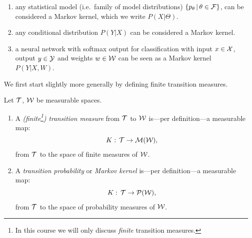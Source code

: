 \begin{Eg}
    \begin{enumerate}
        \item any statistical model (i.e.\ family of model distributions) $\{p_\theta \,|\, \theta \in \mathcal{F}\}$, can 
            be considered a Markov kernel, which we write $P(X|\Theta)$.
        \item any conditional distribution $P(Y|X)$ can be considered a Markov kernel.
        \item a neural network with softmax output for classification with 
            input $x \in \mathcal{X}$, output $y \in \mathcal{Y}$ and weights $w \in \mathcal{W}$ can be seen as a Markov kernel $P(Y|X,W)$.

    \end{enumerate}
\end{Eg}


We first start slightly more generally by defining finite transition measures.

\begin{Def}
    \label{def-finite-transition-measure}
    Let $\mathcal{T}$, $\mathcal{W}$ be measurable spaces.
    \begin{enumerate}
      \item A \emph{(finite\footnote{In this course we will only discuss \emph{finite} transition measures.}) transition measure}  from $\mathcal{T}$ to $\mathcal{W}$
    is---per definition---a measurable map:
    \[ K:\, \mathcal{T} \to \mathcal{M}(\mathcal{W}), \]
        from $\mathcal{T}$ to the space of finite measures of $\mathcal{W}$.
    \item A \emph{transition probability} or \emph{Markov kernel} is---per definition---a measurable map:
    \[ K:\, \mathcal{T} \to \mathcal{P}(\mathcal{W}), \]
    from $\mathcal{T}$ to the space of probability measures of $\mathcal{W}$.
    \end{enumerate}
\end{Def}

